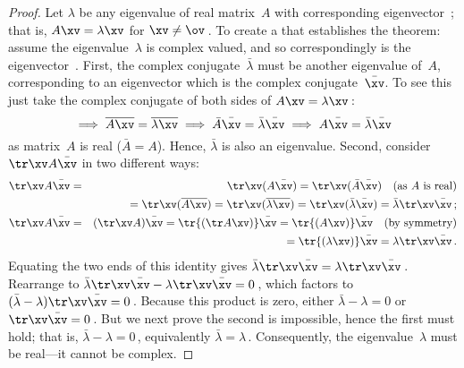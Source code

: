\begin{proof} 
Let \(\lambda\) be any eigenvalue of real matrix~\(A\) with corresponding eigenvector~\xv; that is, \(A\xv=\lambda\xv\) for \(\xv\neq\ov\)\,.
To create a  that establishes the theorem: assume the eigenvalue~\(\lambda\) is complex valued, and so correspondingly is the eigenvector~\xv.
First,  the complex conjugate~\(\bar\lambda\) must be another eigenvalue of~\(A\), corresponding to an eigenvector which is the complex conjugate~\(\bar\xv\).
To see this just take the complex conjugate of both sides of \(A\xv=\lambda\xv\)\,:
\begin{equation*}
\implies \overline{A\xv}=\overline{\lambda\xv}
\implies \bar A\bar\xv=\bar\lambda\bar\xv
\implies A\bar\xv=\bar\lambda\bar\xv
\end{equation*}
as matrix~\(A\) is real (\(\bar A=A\)).
Hence, \(\bar\lambda\) is also an eigenvalue.
Second, consider \(\tr\xv A\bar\xv\) in two different ways:
\begin{eqnarray*}
\tr\xv A\bar\xv&=&\tr\xv(A\bar\xv)
=\tr\xv(\bar A\bar\xv)\quad\text{(as \(A\) is real)}
\\&&{}=\tr\xv(\overline{ A\xv})
=\tr\xv(\overline{ \lambda\xv})
=\tr\xv(\bar\lambda\bar\xv)
=\bar\lambda\tr\xv\bar\xv\,;
\\\tr\xv A\bar\xv&=&(\tr\xv A)\bar\xv
=\tr{(\tr A\xv)}\bar\xv
=\tr{(A\xv)}\bar\xv
\quad\text{(by symmetry)}
\\&&{}=\tr{(\lambda\xv)}\bar\xv
=\lambda\tr\xv\bar\xv\,.
\end{eqnarray*}
Equating the two ends of this identity gives \(\bar\lambda\tr\xv\bar\xv=\lambda\tr\xv\bar\xv\)\,.
Rearrange to \(\bar\lambda\tr\xv\bar\xv-\lambda\tr\xv\bar\xv
=0\)\,, which factors to \((\bar\lambda-\lambda)\tr\xv\bar\xv
=0\)\,.
Because this product is zero, either \(\bar\lambda-\lambda=0\) or \(\tr\xv\bar\xv=0\)\,.
But we next prove the second is impossible, hence the first must hold; that is, \(\bar\lambda-\lambda=0\)\,, equivalently \(\bar\lambda=\lambda\)\,.
Consequently, the eigenvalue~\(\lambda\) must be real---it cannot be complex.


\end{proof}
